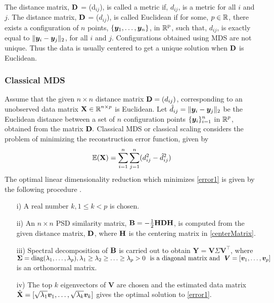 The distance matrix, $\textbf{D}$ = (d$_{ij}$), is called a metric if, $d_{ij}$, is a metric for all $i$ and $j$. The distance matrix, $\textbf{D}$ = ($d_{ij}$), is called Euclidean if for some, $p \in \operatorname{\mathbb{R}}$, there exists a configuration of $n$ points, $\{\boldsymbol{y}_{1}, \ldots, \boldsymbol{y}_{n} \}$, in $\operatorname{\mathbb{R}}^{\text{p}}$, such that, $d_{ij}$, is exactly equal to $\lVert\boldsymbol{y}_{i} - \boldsymbol{y}_{j}\rVert_{2}$, for all $i$ and $j$. Configurations obtained using MDS are not unique. Thus the data is usually
centered to get a unique solution when $\textbf{D}$ is Euclidean.


\subsubsection{Classical MDS}
Assume that the given $n\times n$ distance matrix $\textbf{D} = (d_{ij})$, 
corresponding to an unobserved data matrix $\textbf{X} \in \operatorname{\mathbb{R}}^{n \times p}$ is Euclidean. Let $\hat{d}_{ij} = \lVert\boldsymbol{y}_{i} - \boldsymbol{y}_{j}\rVert_{2}$  be the Euclidean distance between a set of $n$ configuration points 
$\displaystyle \{\boldsymbol{y}_{i}\}_{i=1}^{n}$ in $\operatorname{\mathbb{R}}^{p}$, obtained from the matrix $\textbf{D}.$ Classical MDS or classical scaling  considers the problem of minimizing the reconstruction error function, given by
\begin{equation}\label{error1}
\operatorname{\mathbb{E}}(\textbf{X}) = \displaystyle \sum_{i = 1}^{n} \sum_{j=1}^{n} (d_{ij}^{2} - \hat{d}_{ij}^{2})
\end{equation}
The optimal linear dimensionality reduction which minimizes \eqref{error1} is given by the following procedure \cite{MardiaK.V1979Ma}.
\begin{itemize}
\item[i)] A real number $k, 1 \leq k < p$ is chosen.
\item[ii)] An $n\times n$ PSD similarity matrix, $\textbf{B} = -\frac{1}{2} \textbf{HDH}$, is computed from the given distance matrix, $\textbf{D}$, where $\textbf{H}$ is the centering matrix in \eqref{centerMatrix}.
\item[iii)] Spectral decomposition of $\textbf{B}$ is carried out to 
obtain $\textbf{Y} = \textbf{V} \textbf{$\Sigma$} \textbf{V}^{\top}$,
where 
$\bm{\Sigma} = \text{diag}(\lambda_{1}, \ldots, \lambda_{p}),
 \lambda_{1} \geq \lambda_{2} \geq \ldots \geq \lambda_{p} > 0 \ \
 \text{is a diagonal matrix and} \ \    \bm{V} = [\boldsymbol{v}_{1}, \ldots, \boldsymbol{v}_{p}]$ is an orthonormal matrix.
\item[iv)] The top $k$ eigenvectors of $\textbf{V}$ are chosen
and the estimated data matrix 
$\hat{\textbf{X}} = [\sqrt{\lambda_{1}}\boldsymbol{v}_{1}, \ldots, \sqrt{\lambda_{k}}\boldsymbol{v}_{k} ]$ gives the optimal solution to \eqref{error1}.
\end{itemize}

